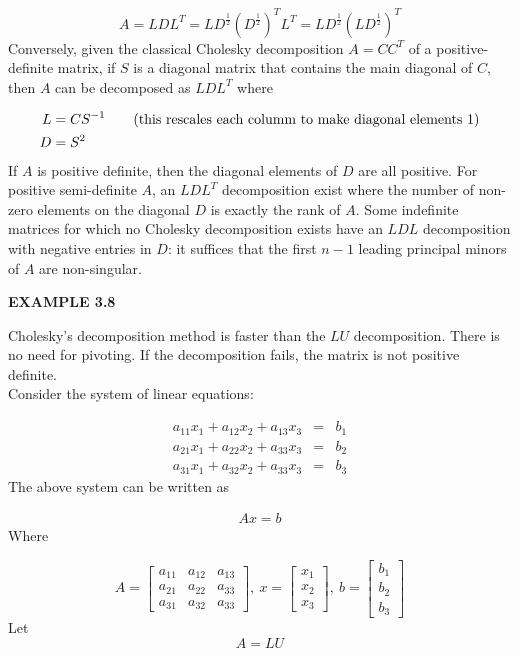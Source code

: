 \documentclass[a4paper, 12pt]{report}
\begin{document}
{\begin{equation*}
A=LDL^T=LD^{\frac{1}{2}}(D^{\frac{1}{2}})^TL^T=LD^{\frac{1}{2}}(LD^{\frac{1}{2}})^T
\end{equation*}
Conversely, given the classical Cholesky decomposition $A=CC^T$ of a positive-definite matrix, if $S$ is a diagonal matrix that contains the main diagonal of $C$, then $A$ can be decomposed as $LDL^T$ where

\begin{align}
L&=CS^{-1} \tag{this rescales each columm to make diagonal elements 1}\\
D&=S^2 \notag
\end{align}
If $A$ is positive definite, then the diagonal elements of $D$ are all positive. For positive semi-definite $A$, an $LDL^T$ decomposition exist where the number of non-zero elements on the diagonal $D$ is exactly the rank of $A$. Some indefinite matrices for which no Cholesky decomposition exists have an $LDL$ decomposition with negative entries in $D$: it suffices that the first $n-1$ leading principal minors of $A$ are non-singular.\\

\begin{center}
	\textbf{EXAMPLE 3.8}
\end{center}
 Cholesky's decomposition method is faster than the $LU$ decomposition. There is no need for pivoting. If the decomposition fails, the matrix is not positive definite.\\
Consider the system of linear equations:

\begin{eqnarray}
a_{11}x_1+a_{12}x_2+a_{13}x_3&=&b_1 \nonumber \\
a_{21}x_1+a_{22}x_2+a_{33}x_3&=&b_2 \nonumber \\
a_{31}x_1+a_{32}x_2+a_{33}x_3&=&b_3 \label{eqn1}
\end{eqnarray}
The above system can be written as

\begin{eqnarray}
Ax=b \label{eqn2}
\end{eqnarray}
Where

\begin{equation*}
A=
\begin{bmatrix} 
a_{11}& a_{12}& a_{13}\\
a_{21}& a_{22}& a_{33}\\ 
a_{31}& a_{32}& a_{33} 
\end{bmatrix}
,\ x=
\begin{bmatrix} x_1\\ x_2\\ x_3 \end{bmatrix}
,\ b=
\begin{bmatrix} b_1\\ b_2\\ b_3 \end{bmatrix}
\end{equation*}
Let 
\begin{equation}
A=LU \label{eqn3}
\end{equation}

}
\end{document}
